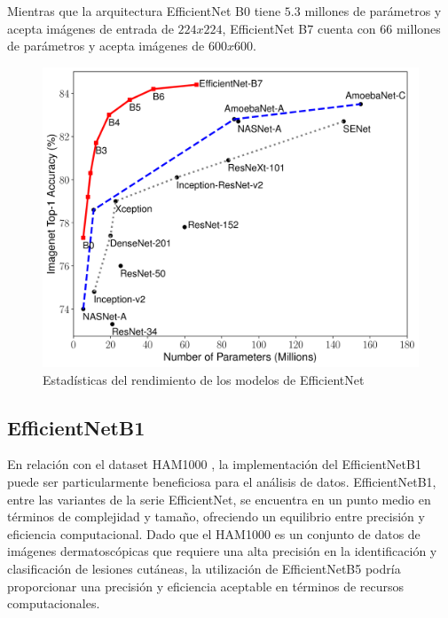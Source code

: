 Mientras que la arquitectura EfficientNet B0 tiene $5.3$ millones de parámetros y acepta imágenes de entrada de $224x224$, EfficientNet B7 cuenta con $66$ millones de parámetros y acepta imágenes de $600x600$. 

\begin{figure}[ht]%
   \begin{center}
   \includegraphics[width=1\textwidth]{./Graphics/efficientnet_performance.png}
   \caption{Estadísticas del rendimiento de los modelos de EfficientNet}
   \label{fig:efficientnet_performance}
   \end{center}
   \end{figure}

\subsection{EfficientNetB1}

En relación con el dataset HAM1000 , la implementación del EfficientNetB1 puede ser particularmente beneficiosa para el análisis de datos. EfficientNetB1, entre las variantes de la serie EfficientNet, se encuentra en un punto medio en términos de complejidad y tamaño, ofreciendo un equilibrio entre precisión y eficiencia computacional. Dado que el HAM1000 es un conjunto de datos de imágenes dermatoscópicas que requiere una alta precisión en la identificación y clasificación de lesiones cutáneas, la utilización de EfficientNetB5 podría proporcionar una precisión y eficiencia aceptable en términos de recursos computacionales.

